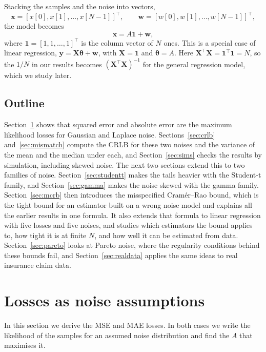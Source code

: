 \documentclass[11pt]{article}
\numberwithin{figure}{section}
\numberwithin{equation}{section}
\begin{document}
Stacking the samples and the noise into vectors,
\[
  \mathbf{x} = [x[0], x[1], \dots, x[N-1]]^\top, \qquad
  \mathbf{w} = [w[0], w[1], \dots, w[N-1]]^\top,
\]
the model becomes
\[
  \mathbf{x} = A\mathbf{1} + \mathbf{w},
\]
where $\mathbf{1} = [1, 1, \dots, 1]^\top$ is the column vector of $N$ ones. This is a special case of linear regression, $\mathbf{y} = \mathbf{X}\boldsymbol{\theta} + \mathbf{w}$, with $\mathbf{X} = \mathbf{1}$ and $\boldsymbol{\theta} = A$. Here $\mathbf{X}^\top\mathbf{X} = \mathbf{1}^\top\mathbf{1} = N$, so the $1/N$ in our results becomes
$(\mathbf{X}^\top\mathbf{X})^{-1}$ for the general regression model, which we study later.

\subsection{Outline}

Section~\ref{sec:losses} shows that squared error and absolute error are the maximum likelihood
losses for Gaussian and Laplace noise. Sections~\ref{sec:crlb} and~\ref{sec:mismatch} compute the
CRLB for these two noises and the variance of the mean and the median under each, and
Section~\ref{sec:sims} checks the results by simulation, including skewed noise. The next two
sections extend this to two families of noise. Section~\ref{sec:studentt} makes the tails heavier
with the Student-t family, and Section~\ref{sec:gamma} makes the noise skewed with the gamma family.
Section~\ref{sec:mcrb} then introduces the misspecified Cram\'er--Rao bound, which is the tight bound
for an estimator built on a wrong noise model and explains all the earlier results in one formula. It
also extends that formula to linear regression with five losses and five noises, and studies which
estimators the bound applies to, how tight it is at finite $N$, and how well it can be estimated from data.
Section~\ref{sec:pareto} looks at Pareto noise, where the regularity conditions behind these bounds
fail, and Section~\ref{sec:realdata} applies the same ideas to real insurance claim data.

\section{Losses as noise assumptions}
\label{sec:losses}

In this section we derive the MSE and MAE losses. In both cases we write the likelihood of the samples for an assumed noise distribution and find the $A$ that maximises it.
\end{document}
